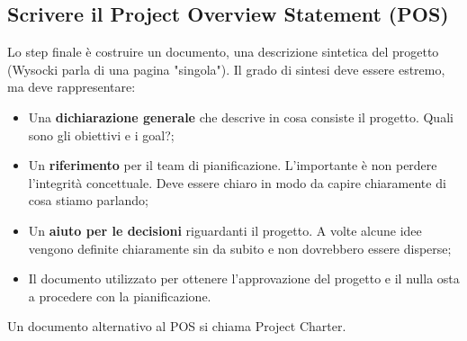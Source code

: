 \subsection{Scrivere il Project Overview Statement (POS)}
Lo step finale è costruire un documento, una descrizione sintetica del progetto (Wysocki parla di una pagina "singola"). Il grado di sintesi deve essere estremo, ma deve rappresentare:
\begin{itemize}
	\item Una \textbf{dichiarazione generale} che descrive in cosa consiste il progetto. Quali sono gli obiettivi e i goal?;
	\item Un \textbf{riferimento} per il team di pianificazione. L'importante è non perdere l'integrità concettuale. Deve essere chiaro in modo da capire chiaramente di cosa stiamo parlando;
	\item Un \textbf{aiuto per le decisioni} riguardanti il progetto. A volte alcune idee vengono definite chiaramente sin da subito e non dovrebbero essere disperse;
	\item Il documento utilizzato per ottenere l'approvazione del progetto e il nulla osta a procedere con la pianificazione.
\end{itemize}
Un documento alternativo al POS si chiama Project Charter.
